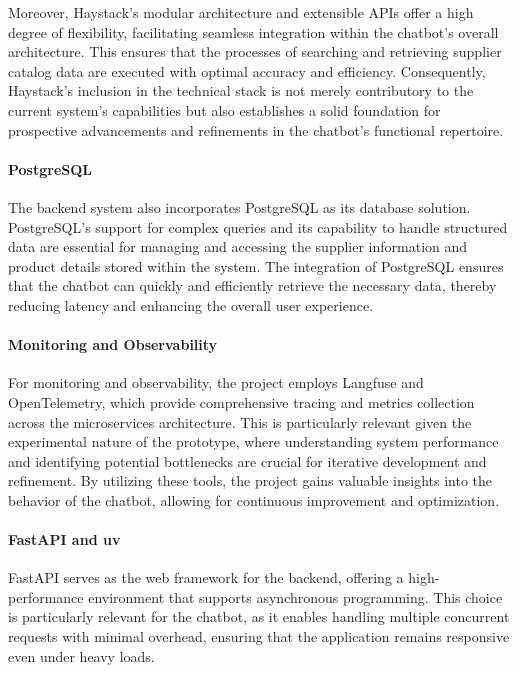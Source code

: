 Moreover, Haystack’s modular architecture and extensible \acp{API} offer a high degree of flexibility, facilitating
seamless integration within the chatbot’s overall architecture. This ensures that the processes of searching and
retrieving supplier catalog data are executed with optimal accuracy and efficiency. Consequently, Haystack’s inclusion
in the technical stack is not merely contributory to the current system’s capabilities but also establishes a solid
foundation for prospective advancements and refinements in the chatbot’s functional repertoire.

\paragraph{PostgreSQL}

The backend system also incorporates PostgreSQL as its database solution. PostgreSQL’s support for complex queries and
its capability to handle structured data are essential for managing and accessing the supplier information and product
details stored within the system.\autocite[cf.][pp. 23--24]{abbasiAdaptiveScalableDatabase2024}
The integration of PostgreSQL ensures that the chatbot can quickly and efficiently
retrieve the necessary data, thereby reducing latency and enhancing the overall user experience.

\paragraph{Monitoring and Observability}

For monitoring and observability, the project employs Langfuse and OpenTelemetry, which provide comprehensive tracing
and metrics collection across the microservices architecture.\autocite[cf.][p. 15014]{thakurReviewOpentelemetryHTTP2022}
This is particularly relevant given the experimental
nature of the prototype, where understanding system performance and identifying potential bottlenecks are crucial for
iterative development and refinement. By utilizing these tools, the project gains valuable insights into the behavior of
the chatbot, allowing for continuous improvement and optimization.

\paragraph{FastAPI and uv}

FastAPI serves as the web framework for the backend, offering a high-performance environment that supports asynchronous
programming.\autocite[cf.][p. 9]{chenModelAlgorithmResearch2023}
This choice is particularly relevant for the chatbot, as it enables handling multiple concurrent requests
with minimal overhead, ensuring that the application remains responsive even under heavy loads.

